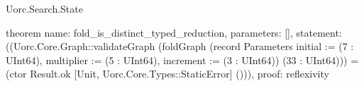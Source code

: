 \begin{lexlean}{Uorc.Search.State}
\begin{semanticmodule}
theorem{
  name: fold_is_distinct_typed_reduction,
  parameters: [],
  statement: ((Uorc.Core.Graph::validateGraph (foldGraph (record Parameters {initial := (7 : UInt64), multiplier := (5 : UInt64), increment := (3 : UInt64)}) (33 : UInt64))) = (ctor Result.ok [Unit, Uorc.Core.Types::StaticError] ())),
  proof: reflexivity{}
}
\end{semanticmodule}
\end{lexlean}
